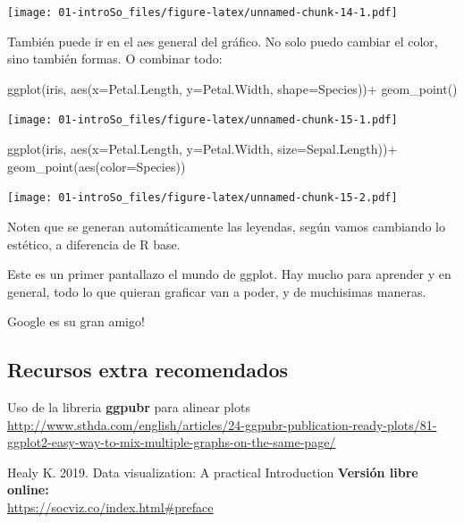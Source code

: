\documentclass[
]{book}
\newenvironment{Shaded}{\begin{snugshade}}{\end{snugshade}}
\newcommand{\AttributeTok}[1]{\textcolor[rgb]{0.77,0.63,0.00}{#1}}
\newcommand{\FunctionTok}[1]{\textcolor[rgb]{0.00,0.00,0.00}{#1}}
\newcommand{\NormalTok}[1]{#1}
\newcommand{\SpecialCharTok}[1]{\textcolor[rgb]{0.00,0.00,0.00}{#1}}
\begin{document}
\texttt{[image: 01-introSo\_files/figure-latex/unnamed-chunk-14-1.pdf]}

También puede ir en el aes general del gráfico. No solo puedo cambiar el color, sino también formas. O combinar todo:

\begin{Shaded}
\begin{Highlighting}[]
\FunctionTok{ggplot}\NormalTok{(iris, }\FunctionTok{aes}\NormalTok{(}\AttributeTok{x=}\NormalTok{Petal.Length, }\AttributeTok{y=}\NormalTok{Petal.Width, }\AttributeTok{shape=}\NormalTok{Species))}\SpecialCharTok{+}
  \FunctionTok{geom\_point}\NormalTok{() }
\end{Highlighting}
\end{Shaded}

\texttt{[image: 01-introSo\_files/figure-latex/unnamed-chunk-15-1.pdf]}

\begin{Shaded}
\begin{Highlighting}[]
\FunctionTok{ggplot}\NormalTok{(iris, }\FunctionTok{aes}\NormalTok{(}\AttributeTok{x=}\NormalTok{Petal.Length, }\AttributeTok{y=}\NormalTok{Petal.Width, }\AttributeTok{size=}\NormalTok{Sepal.Length))}\SpecialCharTok{+}
  \FunctionTok{geom\_point}\NormalTok{(}\FunctionTok{aes}\NormalTok{(}\AttributeTok{color=}\NormalTok{Species)) }
\end{Highlighting}
\end{Shaded}

\texttt{[image: 01-introSo\_files/figure-latex/unnamed-chunk-15-2.pdf]}

Noten que se generan automáticamente las leyendas, según vamos cambiando lo estético, a diferencia de R base.

Este es un primer pantallazo el mundo de ggplot. Hay mucho para aprender y en general, todo lo que quieran graficar van a poder, y de muchisimas maneras.

Google es su gran amigo!

\hypertarget{recursos-extra-recomendados}{%
\subsection{Recursos extra recomendados}\label{recursos-extra-recomendados}}

Uso de la libreria \textbf{ggpubr} para alinear plots \url{http://www.sthda.com/english/articles/24-ggpubr-publication-ready-plots/81-ggplot2-easy-way-to-mix-multiple-graphs-on-the-same-page/}

Healy K. 2019. Data visualization: A practical Introduction \textbf{Versión libre online:}\\
\url{https://socviz.co/index.html\#preface}
\end{document}

